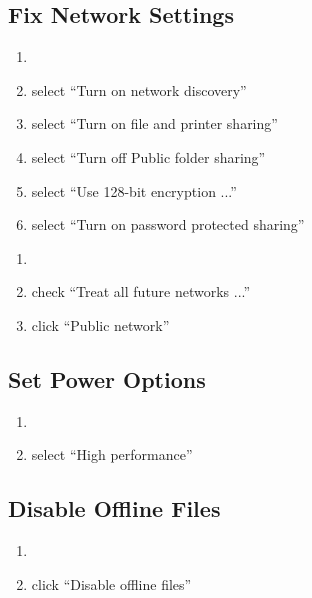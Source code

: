 \documentclass{itsarticle}
\begin{document}
\subsection{Fix Network Settings}
\label{sub:fix_network_settings}

\begin{enumerate}
    \item {}
    \item select ``Turn on network discovery''
    \item select ``Turn on file and printer sharing''
    \item select ``Turn off Public folder sharing''
    \item select ``Use 128-bit encryption ...''
    \item select ``Turn on password protected sharing''
\end{enumerate}

\begin{enumerate}
    \item {}
    \item check ``Treat all future networks ...''
    \item click ``Public network''
\end{enumerate}

\subsection{Set Power Options}
\label{sub:set_power_options}

\begin{enumerate}
    \item {}
    \item select ``High performance''
\end{enumerate}

\subsection{Disable Offline Files}
\label{sub:disable_offline_files}

\begin{enumerate}
    \item {}
    \item click ``Disable offline files''
\end{enumerate}
\end{document}
